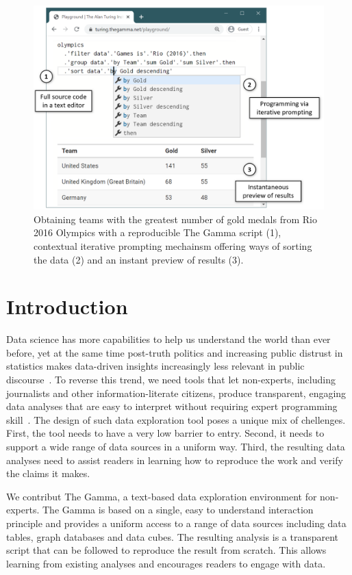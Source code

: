 \documentclass[manuscript,review,anonymous]{acmart}
\begin{document}
\maketitle

\begin{figure}
\includegraphics[width=.54\columnwidth]{figures/thegamma-annot}
\caption{Obtaining teams with the greatest number of gold medals from Rio 2016
Olympics with a reproducible The Gamma script (1), contextual iterative prompting mechainsm
offering ways of sorting the data (2) and an instant preview of results (3).}
\label{fig:thegamma}
\end{figure}

\section{Introduction}
Data science has more capabilities to help us understand the world than ever before, yet at the
same time post-truth politics and increasing public distrust in statistics makes data-driven insights
increasingly less relevant in public discourse~\cite{howstatslost}. To reverse this trend, we
need tools that let non-experts, including journalists and other information-literate citizens,
produce transparent, engaging data analyses that are easy to interpret without requiring expert
programming skill~\cite{ddj}. The design of such data exploration tool poses a unique mix of chellenges.
First, the tool needs to have a very low barrier to entry. Second, it needs to support a wide
range of data sources in a uniform way. Third, the resulting data analyses need to assist
readers in learning how to reproduce the work and verify the claims it makes.

We contribut The Gamma, a text-based data exploration environment for non-experts. The Gamma
is based on a single, easy to understand interaction principle and provides a uniform
access to a range of data sources including data tables, graph databases and data cubes.
The resulting analysis is a transparent script that can be followed to reproduce the
result from scratch. This allows learning from existing analyses and encourages readers
to engage with data.
\end{document}
